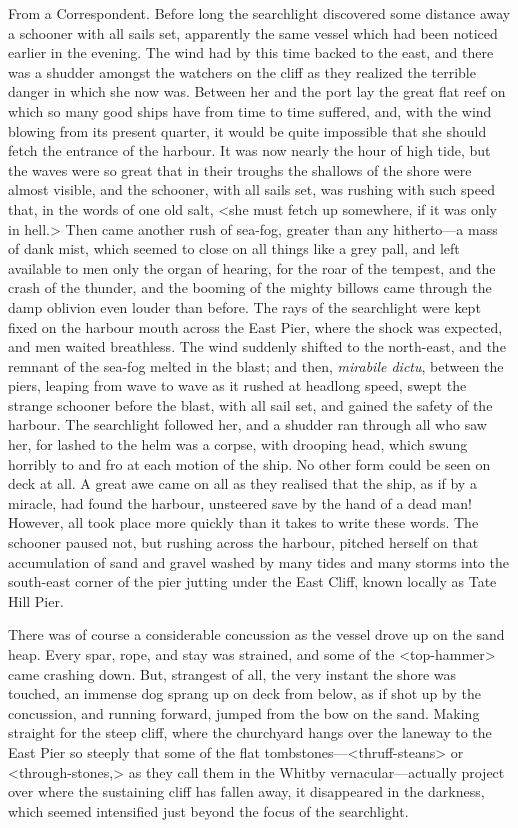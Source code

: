 \begin{newspaper}{}{From a Correspondent.}
Before long the searchlight discovered some distance away a schooner with all sails set, apparently the same vessel which had been noticed earlier in the evening. The wind had by this time backed to the east, and there was a shudder amongst the watchers on the cliff as they realized the terrible danger in which she now was. Between her and the port lay the great flat reef on which so many good ships have from time to time suffered, and, with the wind blowing from its present quarter, it would be quite impossible that she should fetch the entrance of the harbour. It was now nearly the hour of high tide, but the waves were so great that in their troughs the shallows of the shore were almost visible, and the schooner, with all sails set, was rushing with such speed that, in the words of one old salt, <she must fetch up somewhere, if it was only in hell.> Then came another rush of sea-fog, greater than any hitherto—a mass of dank mist, which seemed to close on all things like a grey pall, and left available to men only the organ of hearing, for the roar of the tempest, and the crash of the thunder, and the booming of the mighty billows came through the damp oblivion even louder than before. The rays of the searchlight were kept fixed on the harbour mouth across the East Pier, where the shock was expected, and men waited breathless. The wind suddenly shifted to the north-east, and the remnant of the sea-fog melted in the blast; and then, \textit{mirabile dictu}, between the piers, leaping from wave to wave as it rushed at headlong speed, swept the strange schooner before the blast, with all sail set, and gained the safety of the harbour. The searchlight followed her, and a shudder ran through all who saw her, for lashed to the helm was a corpse, with drooping head, which swung horribly to and fro at each motion of the ship. No other form could be seen on deck at all. A great awe came on all as they realised that the ship, as if by a miracle, had found the harbour, unsteered save by the hand of a dead man! However, all took place more quickly than it takes to write these words. The schooner paused not, but rushing across the harbour, pitched herself on that accumulation of sand and gravel washed by many tides and many storms into the south-east corner of the pier jutting under the East Cliff, known locally as Tate Hill Pier.

There was of course a considerable concussion as the vessel drove up on the sand heap. Every spar, rope, and stay was strained, and some of the <top-hammer> came crashing down. But, strangest of all, the very instant the shore was touched, an immense dog sprang up on deck from below, as if shot up by the concussion, and running forward, jumped from the bow on the sand. Making straight for the steep cliff, where the churchyard hangs over the laneway to the East Pier so steeply that some of the flat tombstones—<thruff-steans> or <through-stones,> as they call them in the Whitby vernacular—actually project over where the sustaining cliff has fallen away, it disappeared in the darkness, which seemed intensified just beyond the focus of the searchlight.


\end{newspaper}
